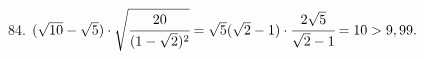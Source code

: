 84. $(\sqrt{10}-\sqrt{5})\cdot\sqrt{\cfrac{20}{(1-\sqrt{2})^2}}=\sqrt{5}(\sqrt{2}-1)\cdot\cfrac{2\sqrt{5}}{\sqrt{2}-1}=10>9,99.$\\
